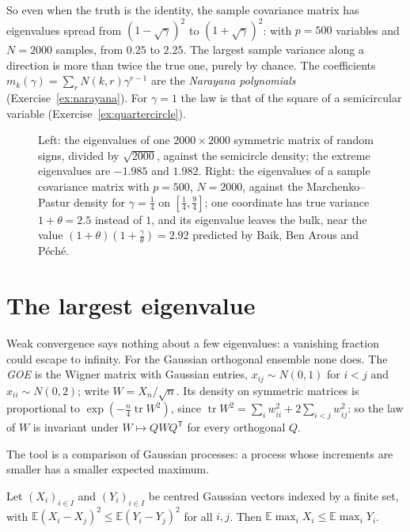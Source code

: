 So even when the truth is the identity, the sample covariance matrix has eigenvalues spread from $(1-\sqrt\gamma)^2$ to $(1+\sqrt\gamma)^2$: with $p=500$ variables and $N=2000$ samples, from $0.25$ to $2.25$. The largest sample
variance along a direction is more than twice the true one, purely by chance. The coefficients $m_k(\gamma)=\sum_rN(k,r)\gamma^{r-1}$ are the \emph{Narayana polynomials} (Exercise~\ref{ex:narayana}). For $\gamma=1$ the law is that
of the square of a semicircular variable (Exercise~\ref{ex:quartercircle}).

\begin{figure}[ht]
\centering
{}
\caption{Left: the eigenvalues of one $2000\times2000$ symmetric matrix of random signs, divided by $\sqrt{2000}$, against the semicircle density; the extreme eigenvalues are $-1.985$ and $1.982$. Right: the eigenvalues of a
sample covariance matrix with $p=500$, $N=2000$, against the Marchenko--Pastur density for $\gamma=\frac14$ on $[\frac14,\frac94]$; one coordinate has true variance $1+\theta=2.5$ instead of $1$, and its eigenvalue leaves the bulk, near
the value $(1+\theta)(1+\frac\gamma\theta)=2.92$ predicted by Baik, Ben Arous and P\'ech\'e.}
\label{fig:laws}
\end{figure}

\section{The largest eigenvalue}

Weak convergence says nothing about a few eigenvalues: a vanishing fraction could escape to infinity. For the Gaussian orthogonal ensemble none does. The \emph{GOE} is the Wigner matrix with Gaussian entries,
$x_{ij}\sim N(0,1)$ for $i<j$ and $x_{ii}\sim N(0,2)$; write $W=X_n/\sqrt n$. Its density on symmetric matrices is proportional to $\exp(-\frac n4\operatorname{tr}W^2)$, since $\operatorname{tr}W^2=\sum_iw_{ii}^2+2\sum_{i<j}w_{ij}^2$: so the law of
$W$ is invariant under $W\mapsto QWQ^{\mathsf T}$ for every orthogonal $Q$.

The tool is a comparison of Gaussian processes: a process whose increments are smaller has a smaller expected maximum.

\begin{lemma}\label{lem:sudakov}
Let $(X_i)_{i\in I}$ and $(Y_i)_{i\in I}$ be centred Gaussian vectors indexed by a finite set, with $\mathbb E(X_i-X_j)^2\le\mathbb E(Y_i-Y_j)^2$ for all $i,j$. Then $\mathbb E\max_iX_i\le\mathbb E\max_iY_i$.
\end{lemma}

